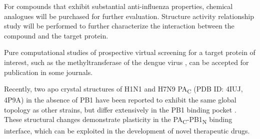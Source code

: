 For compounds that exhibit substantial anti-influenza properties, chemical analogues will be purchased for further evaluation. Structure activity relationship study will be performed to further characterize the interaction between the compound and the target protein.

Pure computational studies of prospective virtual screening for a target protein of interest, such as the methyltransferase of the dengue virus \citep{1435}, can be accepted for publication in some journals.

Recently, two apo crystal structures of H1N1 and H7N9 PA\textsubscript{C} (PDB ID: 4IUJ, 4P9A) in the absence of PB1 have been reported to exhibit the same global topology as other strains, but differ extensively in the PB1 binding pocket \citep{1585}. These structural changes demonstrate plasticity in the PA\textsubscript{C}-PB1\textsubscript{N} binding interface, which can be exploited in the development of novel therapeutic drugs.

\chapterend
